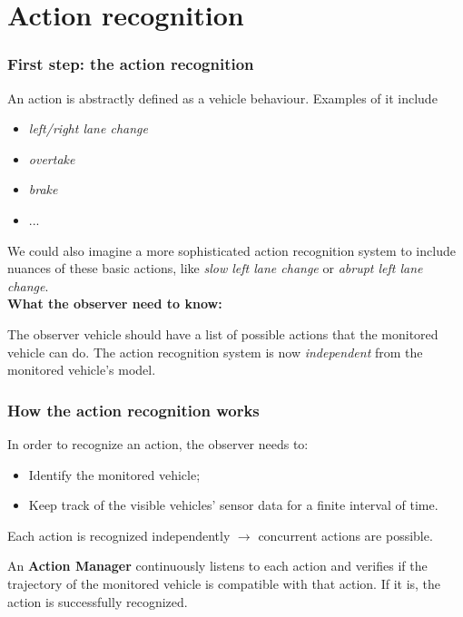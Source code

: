 \documentclass{beamer}
\begin{document}
\section{Action recognition}


\begin{frame}
\frametitle{First step: the action recognition}
An action is abstractly defined as a vehicle behaviour. Examples of
it include 
\begin{itemize}
\item \textit{left/right lane change}
\item \textit{overtake}
\item \textit{brake}
\item ...
\end{itemize}

We could also imagine a more sophisticated action recognition system
to include nuances of these basic actions, like \textit{slow left lane change} or
\textit{abrupt left lane change}.\\

\textbf{What the observer need to know:}

The observer vehicle should have a list of possible actions that the 
monitored vehicle can do. The action recognition system is now \emph{independent} from the monitored vehicle's model. 
\end{frame}

\begin{frame}
\frametitle{How the action recognition works}
In order to recognize an action, the observer needs to:
\begin{itemize}
\item Identify the monitored vehicle;
\item Keep track of the visible vehicles' sensor data for a finite interval of time.
\end{itemize}

Each action is recognized independently $\rightarrow$ concurrent actions are possible.

\bigskip

An \textbf{Action Manager} continuously listens to each action and verifies if the trajectory of the monitored vehicle is compatible with that action. If it is, the action is successfully recognized.

\end{frame}
\end{document}
